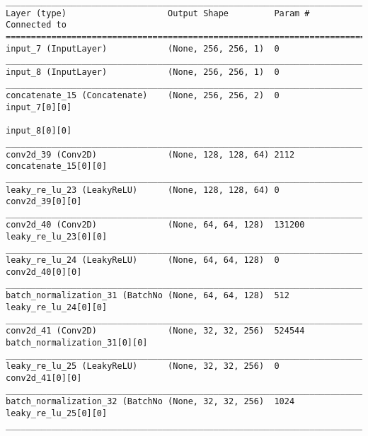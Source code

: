 \begin{verbatim}
__________________________________________________________________________________________________
Layer (type)                    Output Shape         Param #     Connected to                     
==================================================================================================
input_7 (InputLayer)            (None, 256, 256, 1)  0                                            
__________________________________________________________________________________________________
input_8 (InputLayer)            (None, 256, 256, 1)  0                                            
__________________________________________________________________________________________________
concatenate_15 (Concatenate)    (None, 256, 256, 2)  0           input_7[0][0]                    
                                                                 input_8[0][0]                    
__________________________________________________________________________________________________
conv2d_39 (Conv2D)              (None, 128, 128, 64) 2112        concatenate_15[0][0]             
__________________________________________________________________________________________________
leaky_re_lu_23 (LeakyReLU)      (None, 128, 128, 64) 0           conv2d_39[0][0]                  
__________________________________________________________________________________________________
conv2d_40 (Conv2D)              (None, 64, 64, 128)  131200      leaky_re_lu_23[0][0]             
__________________________________________________________________________________________________
leaky_re_lu_24 (LeakyReLU)      (None, 64, 64, 128)  0           conv2d_40[0][0]                  
__________________________________________________________________________________________________
batch_normalization_31 (BatchNo (None, 64, 64, 128)  512         leaky_re_lu_24[0][0]             
__________________________________________________________________________________________________
conv2d_41 (Conv2D)              (None, 32, 32, 256)  524544      batch_normalization_31[0][0]     
__________________________________________________________________________________________________
leaky_re_lu_25 (LeakyReLU)      (None, 32, 32, 256)  0           conv2d_41[0][0]                  
__________________________________________________________________________________________________
batch_normalization_32 (BatchNo (None, 32, 32, 256)  1024        leaky_re_lu_25[0][0]             
__________________________________________________________________________________________________

\end{verbatim}
